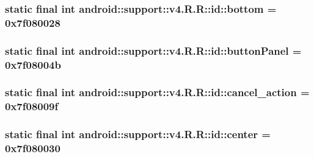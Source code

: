 \hypertarget{classandroid_1_1support_1_1v4_1_1_r_1_1id_975c3da0e7ae537d3458c812ac5c3650}{
\subsubsection[{bottom}]{\setlength{\rightskip}{0pt plus 5cm}static final int android::support::v4.R.R::id::bottom = 0x7f080028}}
\label{classandroid_1_1support_1_1v4_1_1_r_1_1id_975c3da0e7ae537d3458c812ac5c3650}


\hypertarget{classandroid_1_1support_1_1v4_1_1_r_1_1id_a1eb6fbac226ebafed21169f3af4905f}{
\subsubsection[{buttonPanel}]{\setlength{\rightskip}{0pt plus 5cm}static final int android::support::v4.R.R::id::buttonPanel = 0x7f08004b}}
\label{classandroid_1_1support_1_1v4_1_1_r_1_1id_a1eb6fbac226ebafed21169f3af4905f}


\hypertarget{classandroid_1_1support_1_1v4_1_1_r_1_1id_deed6d97414292b88750e4e24b68d0f4}{
\subsubsection[{cancel\_\-action}]{\setlength{\rightskip}{0pt plus 5cm}static final int android::support::v4.R.R::id::cancel\_\-action = 0x7f08009f}}
\label{classandroid_1_1support_1_1v4_1_1_r_1_1id_deed6d97414292b88750e4e24b68d0f4}


\hypertarget{classandroid_1_1support_1_1v4_1_1_r_1_1id_d434f6d4b06768195f53763b03579da0}{
\subsubsection[{center}]{\setlength{\rightskip}{0pt plus 5cm}static final int android::support::v4.R.R::id::center = 0x7f080030}}
\label{classandroid_1_1support_1_1v4_1_1_r_1_1id_d434f6d4b06768195f53763b03579da0}


